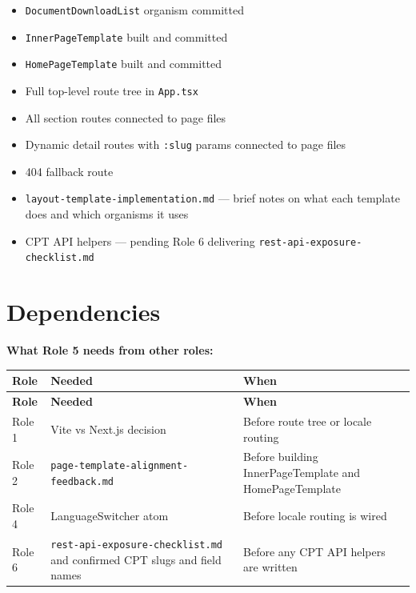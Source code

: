 \documentclass[12pt,a4paper]{article}
\begin{document}
\begin{itemize}
    \item[$\square$] \texttt{DocumentDownloadList} organism committed
    \item[$\square$] \texttt{InnerPageTemplate} built and committed
    \item[$\square$] \texttt{HomePageTemplate} built and committed
    \item[$\square$] Full top-level route tree in \texttt{App.tsx}
    \item[$\square$] All section routes connected to page files
    \item[$\square$] Dynamic detail routes with \texttt{:slug} params connected to page files
    \item[$\square$] 404 fallback route
    \item[$\square$] \texttt{layout-template-implementation.md} --- brief notes on what each template does and which organisms it uses
    \item[$\square$] CPT API helpers --- pending Role 6 delivering \texttt{rest-api-exposure-checklist.md}
\end{itemize}

\section{Dependencies}

\noindent\textbf{What Role 5 needs from other roles:}

\vspace{0.5em}
\begin{longtable}{@{}p{2cm}p{6.5cm}p{3.8cm}@{}}
\toprule
\rowcolor{uvtLightBlue}
\textbf{Role} & \textbf{Needed} & \textbf{When} \\
\midrule
\endfirsthead
\toprule
\rowcolor{uvtLightBlue}
\textbf{Role} & \textbf{Needed} & \textbf{When} \\
\midrule
\endhead
\bottomrule
\endfoot
Role 1 & Vite vs Next.js decision & Before route tree or locale routing \\
Role 2 & \texttt{page-template-alignment-feedback.md} & Before building InnerPageTemplate and HomePageTemplate \\
Role 4 & LanguageSwitcher atom & Before locale routing is wired \\
Role 6 & \texttt{rest-api-exposure-checklist.md} and confirmed CPT slugs and field names & Before any CPT API helpers are written \\
\end{longtable}
\end{document}
